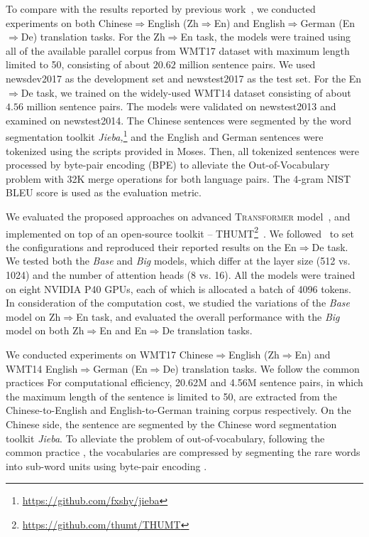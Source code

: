 \documentclass[11pt,a4paper]{article}
\begin{document}
To compare with the results reported by previous work~\cite{pmlr-v70-gehring17a,Vaswani:2017:NIPS,hassan2018achieving}, we conducted experiments on both Chinese$\Rightarrow$English (Zh$\Rightarrow$En) and English$\Rightarrow$German (En$\Rightarrow$De) translation tasks.
For the Zh$\Rightarrow$En task, the models were trained using all of the available parallel corpus from WMT17 dataset with maximum length limited to 50, consisting of about $20.62$ million sentence pairs. We used newsdev2017 as the development set and newstest2017 as the test set. 
For the En$\Rightarrow$De task, we trained on the widely-used WMT14 dataset consisting of about $4.56$ million sentence pairs.  The models were validated on  newstest2013 and examined on newstest2014. 
The Chinese sentences were segmented by the word segmentation toolkit {\em Jieba,}\footnote{\url{https://github.com/fxshy/jieba}} and the English and German sentences were tokenized using the scripts provided in Moses. 
Then, all tokenized sentences were processed by byte-pair encoding (BPE) to alleviate the Out-of-Vocabulary problem \cite{sennrich2015neural} with 32K merge operations for both language pairs.
The 4-gram NIST BLEU score \cite{papineni2002bleu} is used as the evaluation metric.

We evaluated the proposed approaches on advanced \textsc{Transformer} model~\cite{Vaswani:2017:NIPS}, and implemented on top of an open-source toolkit -- THUMT\footnote{\url{https://github.com/thumt/THUMT}}~\cite{zhang2017thumt}. We followed~ to set the configurations and reproduced their reported results on the En$\Rightarrow$De task.
We tested both the \emph{Base} and \emph{Big} models, which differ at the layer size (512 vs. 1024) and the number of attention heads (8 vs. 16). All the models were trained on eight NVIDIA P40 GPUs, each of which is allocated a batch of 4096 tokens.  In consideration of the computation cost, we studied the variations of the \emph{Base} model on Zh$\Rightarrow$En task, and evaluated the overall performance with the \emph{Big} model on both Zh$\Rightarrow$En and En$\Rightarrow$De translation tasks.






\iffalse 
We conducted experiments on WMT17 Chinese$\Rightarrow$English (Zh$\Rightarrow$En) and WMT14 English$\Rightarrow$German (En$\Rightarrow$De) translation tasks. 
We follow the common practices 
For computational efficiency, 20.62M and 4.56M sentence pairs, in which the maximum length of the sentence is limited to 50, are extracted from the Chinese-to-English and English-to-German training corpus respectively. On the Chinese side, the sentence are segmented by the Chinese word segmentation toolkit {\em Jieba}. To alleviate the problem of out-of-vocabulary, following the common practice \cite{sennrich2015neural,hassan2018achieving}, the vocabularies are compressed by segmenting the rare words into sub-word units using byte-pair encoding \cite{gage1994new}. 
\end{document}
